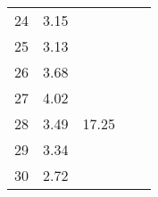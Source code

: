 \begin{center}
\begin{tabular}{| l || c | c | c | c |}
24 & \multirow{1}{*}{ 3.15 }  & & & \\\cline{2-2}
25 & \multirow{1}{*}{ 3.13 }  & & & \\\cline{2-2}\cline{3-3}
26 & \multirow{1}{*}{ 3.68 }  & \multirow{5}{*}{ 17.25 }  & & \\\cline{2-2}
27 & \multirow{1}{*}{ 4.02 }  & & & \\\cline{2-2}
28 & \multirow{1}{*}{ 3.49 }  & & & \\\cline{2-2}
29 & \multirow{1}{*}{ 3.34 }  & & & \\\cline{2-2}
30 & \multirow{1}{*}{ 2.72 }  & & & \\\cline{2-2}\cline{3-3}\cline{4-4}\cline{5-5}
\hline\end{tabular}
\end{center}